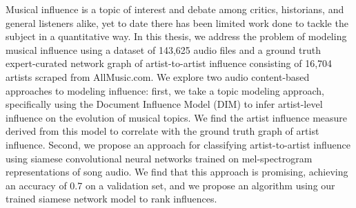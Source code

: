 Musical influence is a topic of interest and debate among critics, historians, and general listeners alike, yet to date there has been limited work done to tackle the subject in a quantitative way. In this thesis, we address the problem of modeling musical influence using a dataset of 143,625 audio files and a ground truth expert-curated network graph of artist-to-artist influence consisting of 16,704 artists scraped from AllMusic.com. We explore two audio content-based approaches to modeling influence: first, we take a topic modeling approach, specifically using the Document Influence Model (DIM) to infer artist-level influence on the evolution of musical topics. We find the artist influence measure derived from this model to correlate with the ground truth graph of artist influence. Second, we propose an approach for classifying artist-to-artist influence using siamese convolutional neural networks trained on mel-spectrogram representations of song audio. We find that this approach is promising, achieving an accuracy of 0.7 on a validation set, and we propose an algorithm using our trained siamese network model to rank influences.
